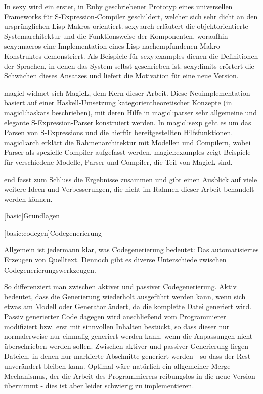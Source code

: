 \documentclass[a4paper, bibgerm]{article}
\newcommand\lsection{}
\newcommand\lsubsection{}
\newcommand\cref{}
\newcommand\sref{}
\begin{document}
In \cref{sexy} wird ein erster, in Ruby geschriebener Prototyp eines
universellen Frameworks für S-Expression-Compiler geschildert, welcher
sich sehr dicht an den ursprünglichen Lisp-Makros
orientiert. \sref{sexy:arch} erläutert die objektorientierte
Systemarchitektur und die Funktionsweise der Komponenten, woraufhin
\sref{sexy:macros} eine Implementation eines Lisp nachempfundenen
Makro-Konstruktes demonstriert. Als Beispiele für \sref{sexy:examples}
dienen die Definitionen der Sprachen, in denen das System selbst
geschrieben ist. \sref{sexy:limits} erörtert die Schwächen dieses
Ansatzes und liefert die Motivation für eine neue Version.

\cref{magicl} widmet sich MagicL, dem Kern dieser Arbeit. Diese
Neuimplementation basiert auf einer Haskell-Umsetzung
kategorientheoretischer Konzepte (in \sref{magicl:haskats} beschrieben),
mit deren Hilfe in \sref{magicl:parser} sehr allgemeine und elegante
S-Expression-Parser konstruiert werden. In \sref{magicl:sexp} geht es um das Parsen
von S-Expressions und die hierfür bereitgestellten
Hilfsfunktionen. \sref{magicl:arch} erklärt die Rahmenarchitektur mit
Modellen und Compilern, wobei Parser als spezielle Compiler aufgefasst
werden. \sref{magicl:examples} zeigt Beispiele für verschiedene Modelle,
Parser und Compiler, die Teil von MagicL sind.

\cref{end} fasst zum Schluss die Ergebnisse zusammen und gibt
einen Ausblick auf viele weitere Ideen und Verbesserungen, die nicht im
Rahmen dieser Arbeit behandelt werden können.

\lsection[basic]{Grundlagen}

\lsubsection[basic:codegen]{Codegenerierung}

Allgemein ist jedermann klar, was Codegenerierung bedeutet:
Das automatisiertes Erzeugen von Quelltext. Dennoch gibt es diverse
Unterschiede zwischen Codegenerierungswerkzeugen.

So differenziert man zwischen aktiver und passiver
Codegenerierung. Aktiv bedeutet, dass die Generierung wiederholt
ausgeführt werden kann, wenn sich etwas am Modell oder Generator ändert,
da die komplette Datei generiert wird. Passiv generierter Code dagegen
wird anschließend vom Programmierer modifiziert bzw. erst mit sinnvollen
Inhalten bestückt, so dass dieser nur normalerweise nur einmalig
generiert werden kann, wenn die Anpassungen nicht überschrieben werden
sollen. Zwischen aktiver und passiver Generierung liegen Dateien, in
denen nur markierte Abschnitte generiert werden - so dass der Rest
unverändert bleiben kann. Optimal wäre natürlich ein allgemeiner
Merge-Mechanismus, der die Arbeit des Programmierers reibungslos in die
neue Version übernimmt - dies ist aber leider schwierig zu
implementieren.
\end{document}
